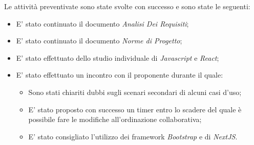 Le attività preventivate sono state svolte con successo e sono state le seguenti:
\begin{itemize}
    \item E' stato continuato il documento \emph{Analisi Dei Requisiti};
    \item E' stato continuato il documento \emph{Norme di Progetto};
    \item E' stato effettuato dello studio individuale di \emph{Javascript} e \emph{React};
    \item E' stato effettuato un incontro con il proponente durante il quale:
    \begin{itemize}
        \item Sono stati chiariti dubbi sugli scenari secondari di alcuni casi d'uso;
        \item E' stato proposto con successo un timer entro lo scadere del quale è possibile fare le modifiche all'ordinazione collaborativa;
        \item E' stato consigliato l'utilizzo dei framework \emph{Bootstrap} e di \emph{NextJS}.
    \end{itemize}
\end{itemize}
